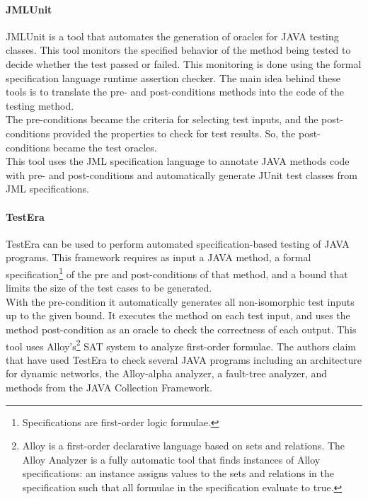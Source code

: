 \paragraph{JMLUnit}
JMLUnit\cite{Cheon04thejml} is a tool that automates the generation of oracles for JAVA testing classes. This tool
monitors the specified behavior of the method being tested to decide whether the test passed or failed.
This monitoring is done using the formal specification language runtime assertion checker.
The main idea behind these tools is to translate the pre- and post-conditions methods into the code of the testing method.\\
The pre-conditions became the criteria for selecting test inputs, and the post-conditions provided the properties to check for
test results. So, the post-conditions became the test oracles.\\
This tool uses the \ac{JML}\cite{Burdy03anoverview} specification language to annotate JAVA methods code with pre- and post-conditions and
automatically generate JUnit test classes from \ac{JML} specifications.

\paragraph{TestEra}
TestEra\cite{testera} can be used to perform automated specification-based testing of
JAVA programs. This framework requires as input a JAVA method, a formal specification\footnote{Specifications are first-order logic formulae.}
of the pre and post-conditions of that method, and a bound that limits the size of the test cases to be generated.\\
With the pre-condition it automatically generates all non-isomorphic test inputs up to the given bound.
It executes the method on each test input, and uses the method post-condition as an oracle to check the correctness of each output. This tool
uses Alloy's\footnote{Alloy is a first-order declarative language based on sets and relations. The Alloy Analyzer is a fully
automatic tool that finds instances of Alloy specifications: an instance
assigns values to the sets and relations in the specification such that
all formulae in the specification evaluate to true.} \ac{SAT} system to analyze first-order  formulae.
The authors claim that have used TestEra to check several JAVA programs including an architecture for
dynamic networks, the Alloy-alpha analyzer, a fault-tree analyzer, and methods from the JAVA Collection Framework.

